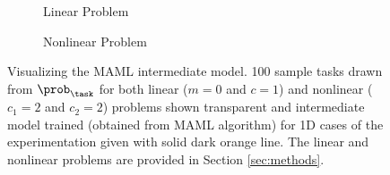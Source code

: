 \begin{figure}[ht!]
  \centering
  \begin{subfigure}[b]{0.49\textwidth}
    \centering
    \caption{Linear Problem}
    \label{fig:lin_maml}
  \end{subfigure}
  \begin{subfigure}[b]{0.49\textwidth}
    \centering
    \caption{Nonlinear Problem}
    \label{fig:nonlin_maml}
  \end{subfigure}
  \caption{Visualizing the MAML intermediate model. 100 sample tasks drawn from $\prob_\task$ for both linear ($m=0$ and $c=1$) and nonlinear ($c_1=2$ and $c_2=2$) problems shown transparent and intermediate model trained (obtained from MAML algorithm) for 1D cases of the experimentation given with solid dark orange line. The linear and nonlinear problems are provided in Section \ref{sec:methods}.}
\end{figure}


